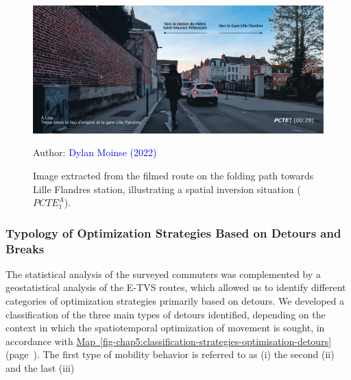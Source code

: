 \begin{refsegment}
    \begin{figure}[h!]\vspace*{4pt}
        \caption{Image extracted from the filmed route on the folding path towards Lille Flandres station, illustrating a spatial inversion situation (\(PCTE^{A}_{1}\)).}
        \label{fig-chap5:pcte1a-inversion-spatiale}
        \centerline{\includegraphics[width=1\columnwidth]{src/Figures/Chap-5/EN_Detours_PCTE1_Access_1.jpg}}
        \vspace{5pt}
        \begin{flushright}\scriptsize{
        Author: \textcolor{blue}{Dylan Moinse (2022)}
        }\end{flushright}
    \end{figure}

\subsubsection*{Typology of Optimization Strategies Based on Detours and Breaks
    \label{chap5:typologie-strategies-optimisation}
    }
 
The statistical analysis of the surveyed commuters was complemented by a geostatistical analysis of the \acrshort{E-TVS} routes, which allowed us to identify different categories of optimization strategies primarily based on detours. We developed a classification of the three main types of detours identified, depending on the context in which the spatiotemporal optimization of movement is sought, in accordance with \hyperref[fig-chap5:classification-strategies-optimisation-detours]{Map~\ref{fig-chap5:classification-strategies-optimisation-detours}} (page~\pageref{fig-chap5:classification-strategies-optimisation-detours}). The first type of mobility behavior is referred to as (i)  the second (ii)  and the last (iii) %


\end{refsegment}
